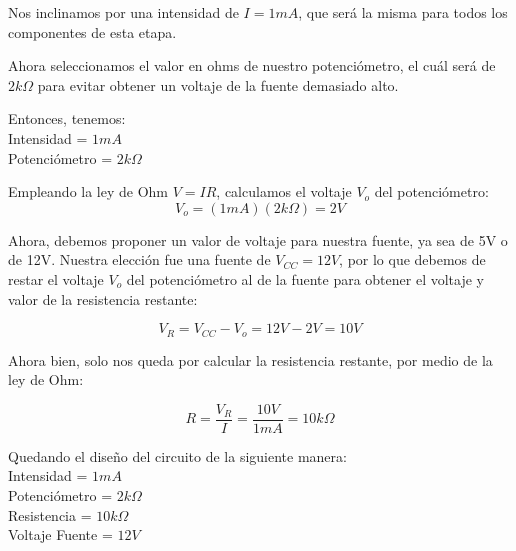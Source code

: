 \documentclass[12pt]{article}
\begin{document}
        Nos inclinamos por una intensidad de $I = 1 mA$, que será la misma para todos los componentes de esta etapa.
        
        Ahora seleccionamos el valor en ohms de nuestro potenciómetro, el cuál será de $2k\Omega$ para evitar obtener un voltaje de la fuente demasiado alto.

        Entonces, tenemos:\\
        Intensidad = $1mA$\\
        Potenciómetro = $2k\Omega$
        
        Empleando la ley de Ohm $V = IR$, calculamos el voltaje $V_{o}$ del potenciómetro:
        $$V_{o} = (1 mA)(2k\Omega) = 2 V$$
        
        Ahora, debemos proponer un valor de voltaje para nuestra fuente, ya sea de 5V o de 12V. Nuestra elección fue una fuente de $V_{CC} = 12V$, por lo que debemos de restar el voltaje $V_{o}$ del potenciómetro al de la fuente para obtener el voltaje y valor de la resistencia restante:
        
        $$V_{R} = V_{CC} - V_{o} = 12V - 2V = 10V$$
        
        Ahora bien, solo nos queda por calcular la resistencia restante, por medio de la ley de Ohm:
        
        $$R = \frac{V_{R}}{I} = \frac{10 V}{1 mA} = 10k\Omega$$
        
        Quedando el diseño del circuito de la siguiente manera:\\
        Intensidad = $1mA$\\
        Potenciómetro = $2k\Omega$\\
        Resistencia = $10k\Omega$\\
        Voltaje Fuente = $12 V$
        
\end{document}
